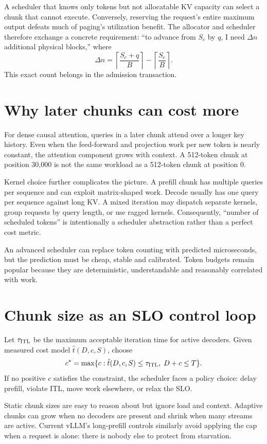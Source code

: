 A scheduler that knows only tokens but not allocatable KV capacity can select a chunk
that cannot execute. Conversely, reserving the request's entire maximum output defeats
much of paging's utilization benefit. The allocator and scheduler therefore exchange
a concrete requirement: ``to advance from $S_c$ by $q$, I need $\Delta n$ additional
physical blocks,'' where
\[
\Delta n =
\left\lceil\frac{S_c+q}{B}\right\rceil-
\left\lceil\frac{S_c}{B}\right\rceil.
\]
This exact count belongs in the admission transaction.

\section{Why later chunks can cost more}

For dense causal attention, queries in a later chunk attend over a longer key history.
Even when the feed-forward and projection work per new token is nearly constant, the
attention component grows with context. A 512-token chunk at position 30,000 is not
the same workload as a 512-token chunk at position 0.

Kernel choice further complicates the picture. A prefill chunk has multiple queries
per sequence and can exploit matrix-shaped work. Decode usually has one query per
sequence against long KV. A mixed iteration may dispatch separate kernels, group
requests by query length, or use ragged kernels. Consequently, ``number of scheduled
tokens'' is intentionally a scheduler abstraction rather than a perfect cost metric.

An advanced scheduler can replace token counting with predicted microseconds, but the
prediction must be cheap, stable and calibrated. Token budgets remain popular because
they are deterministic, understandable and reasonably correlated with work.

\section{Chunk size as an SLO control loop}

Let $\tau_{\rm ITL}$ be the maximum acceptable iteration time for active decoders.
Given measured cost model $\hat t(D,c,S)$, choose
\[
c^*=\max\{c: \hat t(D,c,S)\le\tau_{\rm ITL},\;D+c\le T\}.
\]
If no positive $c$ satisfies the constraint, the scheduler faces a policy choice:
delay prefill, violate ITL, move work elsewhere, or relax the SLO.

Static chunk sizes are easy to reason about but ignore load and context. Adaptive
chunks can grow when no decoders are present and shrink when many streams are active.
Current vLLM's long-prefill controls similarly avoid applying the cap when a request
is alone: there is nobody else to protect from starvation.

